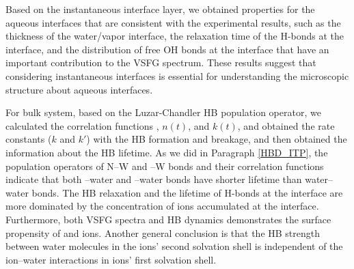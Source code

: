 Based on the instantaneous interface layer, we obtained properties for the aqueous interfaces that are consistent with the experimental results, 
such as the thickness of the water/vapor interface, the relaxation time of the H-bonds at the interface, 
and the distribution of free OH bonds at the interface that have an important contribution to the VSFG spectrum.
These results suggest that considering instantaneous interfaces is essential for understanding the microscopic structure about aqueous interfaces.

For bulk system, based on the Luzar-Chandler HB population operator, 
we calculated the correlation functions \CHB, $n(t)$, and $k(t)$, and obtained the rate constants ($k$ and $k'$) with the HB formation and breakage, 
and then obtained the information about the HB lifetime. 
As we did in Paragraph \ref{HBD_ITP}, the population operators of N--W 
and \I--W bonds and their correlation functions 
indicate that both \nitrate--water and \I--water bonds have shorter lifetime than water--water bonds.
The HB relaxation and the lifetime of H-bonds
at the interface are more dominated by the concentration of ions accumulated at the interface. 
Furthermore, both VSFG spectra and HB dynamics demonstrates the surface propensity of \nitrate and \I ions.
Another general conclusion is that the HB strength between water molecules in the ions' second solvation shell is independent 
of the ion--water interactions in ions' first solvation shell.

